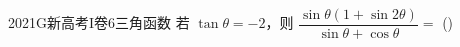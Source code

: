 
\begin{problem}{2021}{G}{新高考I卷}{6}{三角函数}
若 $ \tan\theta=-2 $，则 $ \dfrac{\sin\theta(1+\sin2\theta)}{\sin\theta+\cos\theta}= $ (\hspace{1cm})
\end{problem}

\begin{choices}
\end{choices}